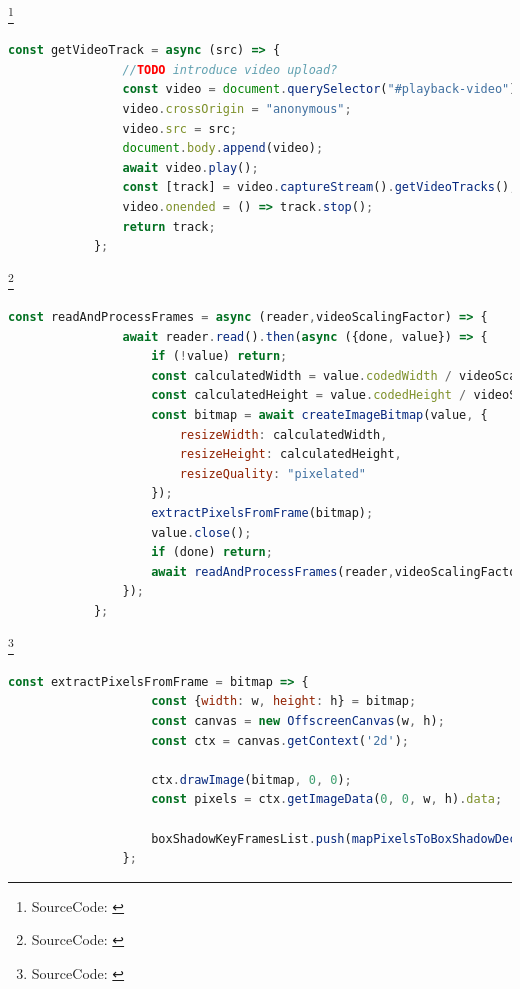\documentclass[xcolor=dvipsnames,10pt]{beamer}
\begin{document}
\begin{frame}[fragile]{\secname\footnote{SourceCode: \cite{videoToCss}}}
	\begin{center}
		\begin{minipage}{1\textwidth}
			\begin{lstlisting}[language=JavaScript, caption=getVideoTrack()]
			const getVideoTrack = async (src) => {
				//TODO introduce video upload?
				const video = document.querySelector("#playback-video");
				video.crossOrigin = "anonymous";
				video.src = src;
				document.body.append(video);
				await video.play();
				const [track] = video.captureStream().getVideoTracks();
				video.onended = () => track.stop();
				return track;
			};
			\end{lstlisting}
		\end{minipage}
	\end{center}
\end{frame}
\begin{frame}[fragile]{\secname\footnote{SourceCode: \cite{videoToCss}}}
	\begin{center}
		\begin{minipage}{1\textwidth}
			\begin{lstlisting}[language=JavaScript, caption=readAndProcessFrames()]
			const readAndProcessFrames = async (reader,videoScalingFactor) => {
				await reader.read().then(async ({done, value}) => {
					if (!value) return;
					const calculatedWidth = value.codedWidth / videoScalingFactor;
					const calculatedHeight = value.codedHeight / videoScalingFactor;
					const bitmap = await createImageBitmap(value, {
						resizeWidth: calculatedWidth,
						resizeHeight: calculatedHeight,
						resizeQuality: "pixelated"
					});
					extractPixelsFromFrame(bitmap);
					value.close();
					if (done) return;
					await readAndProcessFrames(reader,videoScalingFactor);
				});
			};
			\end{lstlisting}
		\end{minipage}
	\end{center}
\end{frame}
\begin{frame}[fragile]{\secname\footnote{SourceCode: \cite{videoToCss}}}
	\begin{center}
		\begin{minipage}{1\textwidth}
			\begin{lstlisting}[language=JavaScript, caption=extractPixelsFromFrame()]
				const extractPixelsFromFrame = bitmap => {
					const {width: w, height: h} = bitmap;
					const canvas = new OffscreenCanvas(w, h);
					const ctx = canvas.getContext('2d');

					ctx.drawImage(bitmap, 0, 0);
					const pixels = ctx.getImageData(0, 0, w, h).data;

					boxShadowKeyFramesList.push(mapPixelsToBoxShadowDeclaration(w, h, pixels));
				};
			\end{lstlisting}
		\end{minipage}
	\end{center}
\end{frame}
\end{document}
